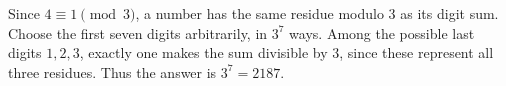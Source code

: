Since $4\equiv 1\pmod 3$, a number has the same residue modulo $3$ as its digit sum. Choose the first seven digits arbitrarily, in $3^7$ ways. Among the possible last digits $1,2,3$, exactly one makes the sum divisible by $3$, since these represent all three residues. Thus the answer is $3^7=\boxed{2187}$.
